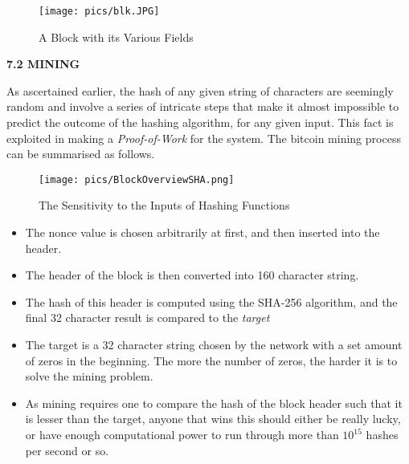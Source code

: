 \documentclass[12pt,a4paper]{report}
\begin{document}
\begin{flushleft}
\vspace{10mm}
\begin{figure}[h]
\centering
\caption{A Block with its Various Fields}
\texttt{[image: pics/blk.JPG]}
\end{figure}
\vspace{10mm}



\vspace{10mm}
\newpage

\vspace{10mm}
\textbf{7.2 MINING}
\vspace{10mm}

As ascertained earlier, the hash of any given string of characters are seemingly random and involve a series of intricate steps that make it almost impossible to predict the outcome of the hashing algorithm, for any given input. This fact is exploited in making a \textit{Proof-of-Work} for the system. The bitcoin mining process can be summarised as follows.


\vspace{10mm}
\begin{figure}[h]
\centering
\caption{The Sensitivity to the Inputs of Hashing Functions}
\texttt{[image: pics/BlockOverviewSHA.png]}
\end{figure}
\vspace{10mm}

\begin{itemize}
    \item The nonce value is chosen arbitrarily at first, and then inserted into the header.
    \item The header of the block is then converted into 160 character string.
    \item The hash of this header is computed using the SHA-256 algorithm, and the final 32 character result is compared to the \textit{target}
    \item The target is a 32 character string chosen by the network with a set amount of zeros in the beginning. The more the number of zeros, the harder it is to solve the mining problem.
    \item As mining requires one to compare the hash of the block header such that it is lesser than the target, anyone that wins this should either be really lucky, or have enough computational power to run through more than $10^{15}$ hashes per second or so. 
    
\end{itemize}
\vspace{10mm}


\end{flushleft}
\end{document}
